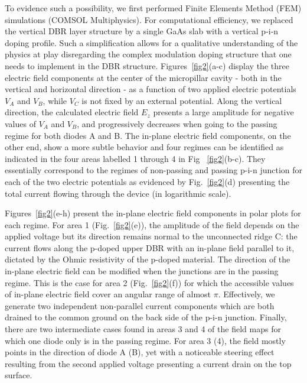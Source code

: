 \documentclass[article,twocolumn, superscriptaddress, 10pt, nofootinbib]{revtex4-1}%
\begin{document}
To evidence such a possibility, we first performed  Finite Elements Method (FEM) simulations (COMSOL Multiphysics). For computational efficiency, we replaced the vertical DBR layer structure by a single GaAs slab with a vertical p-i-n doping profile. Such a simplification allows for a qualitative understanding of the physics at play disregarding the complex modulation doping structure that one needs to implement in the {DBR structure}.  Figures~\ref{fig2}(a-c) display the three electric field components at the  center of the micropillar cavity - both in the vertical and horizontal direction -  as a function of two applied electric potentials $V_A$ and $V_B$, while $V_C$ is not fixed by an external potential. 
Along the vertical direction, the calculated electric field $E_z$ presents a large amplitude for negative values of $V_A$ and $V_B$, and progressively decreases when going to the passing regime  for both diodes A and B. The in-plane electric field components, on the other end, show a more subtle behavior and  
 four  regimes can be identified as indicated in the four areas labelled 1 through 4 in Fig ~\ref{fig2}(b-c). They essentially correspond to the regimes of non-passing and  passing p-i-n junction for each of the two electric potentials as evidenced by Fig.~\ref{fig2}(d) presenting the total current flowing through the device (in logarithmic scale).



 
Figures~\ref{fig2}(e-h) present the {in-plane electric field components} in  polar plots for each regime. For area 1 (Fig.~\ref{fig2}(e)), the amplitude of  the field depends on the applied voltage but its direction remains normal to the unconnected ridge C: the current flows  along the p-doped upper DBR with an in-plane field parallel to it, dictated by the Ohmic resistivity of the p-doped material. 
The direction of the in-plane electric field can be modified when the junctions are in the passing regime. This is the case for area 2 (Fig.~\ref{fig2}(f)) for which {the accessible values of in-plane electric field cover an angular range of almost $\pi$}. Effectively, we generate two independent non-parallel current components which are both drained to the common ground on the back side of the p-i-n junction. Finally, there are two intermediate cases found in areas 3 and 4 of the field maps for which one diode only is in the passing regime. For area 3 (4), the field mostly points in the direction of diode A (B), yet with a noticeable steering effect resulting from the second applied voltage presenting a current drain on the top surface.  
\end{document}

